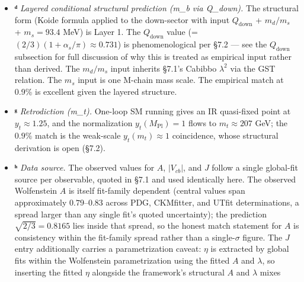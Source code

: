 \documentclass[
]{article}
\begin{document}
\begin{itemize}
  derived \(\lambda g_0^2 = 0.1217\) within \(1.4\%\) (NLO truncation).
  The central-value match \(m_b/m_\tau = 0.5\sigma\) is at \(L = 32\);
  systematic uncertainty including finite-volume and regulator effects
  is \(\sim 1\)--\(2\%\) (§7.5). Within the four-layer framing (§8.3),
  the prediction is MC-verified at the matching-condition level with the
  Layer 2(a)-tractable analytical closure pending. The \(Z_S\) value is
  taken on the standard (Haar--Wilson) measure; whether the induced
  measure inherits it is open, the directly sampled construction
  differing by \(+2.6\%\) at the point checked (§6.5).
\item
  \textbf{ᵈ} \emph{Layered conditional structural prediction (m\_b via
  Q\_down).} The structural form (Koide formula applied to the
  down-sector with input \(Q_{\text{down}}\) + \(m_d/m_s\) +
  \(m_s = 93.4\) MeV) is Layer 1. The \(Q_{\text{down}}\) value (=
  \((2/3)(1 + \alpha_s/\pi) \approx 0.731\)) is phenomenological per
  §7.2 --- see the \(Q_\text{down}\) subsection for full discussion of
  why this is treated as empirical input rather than derived. The
  \(m_d/m_s\) input inherits §7.1's Cabibbo \(\lambda^2\) via the GST
  relation. The \(m_s\) input is one M-chain mass scale. The empirical
  match at 0.9\% is excellent given the layered structure.
\item
  \textbf{ᵍ} \emph{Retrodiction (m\_t).} One-loop SM running gives an IR
  quasi-fixed point at \(y_t \approx 1.25\), and the normalization
  \(y_t(M_{\text{Pl}}) = 1\) flows to \(m_t \approx 207\) GeV; the
  \(0.9\%\) match is the weak-scale \(y_t(m_t) \approx 1\) coincidence,
  whose structural derivation is open (§7.2).
\item
  \textbf{ʰ} \emph{Data source.} The observed values for \(A\),
  \(|V_{cb}|\), and \(J\) follow a single global-fit source per
  observable, quoted in §7.1 and used identically here. The observed
  Wolfenstein \(A\) is itself fit-family dependent (central values span
  approximately \(0.79\)--\(0.83\) across PDG, CKMfitter, and UTfit
  determinations, a spread larger than any single fit's quoted
  uncertainty); the prediction \(\sqrt{2/3} = 0.8165\) lies inside that
  spread, so the honest match statement for \(A\) is consistency within
  the fit-family spread rather than a single-\(\sigma\) figure. The
  \(J\) entry additionally carries a parametrization caveat: \(\eta\) is
  extracted by global fits within the Wolfenstein parametrization using
  the fitted \(A\) and \(\lambda\), so inserting the fitted \(\eta\)
  alongside the framework's structural \(A\) and \(\lambda\) mixes

\end{itemize}
\end{document}
